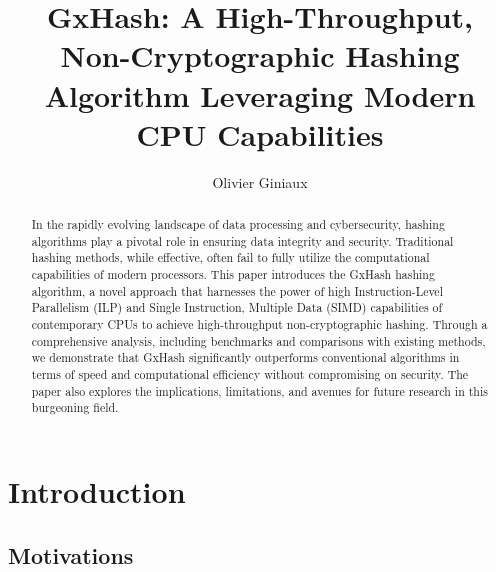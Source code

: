 \documentclass[10pt]{article}
\title{GxHash: A High-Throughput, Non-Cryptographic Hashing Algorithm Leveraging Modern CPU Capabilities}
\author{Olivier Giniaux}
\date{}
\begin{document}
\maketitle

\begin{abstract}

In the rapidly evolving landscape of data processing and cybersecurity, hashing algorithms play a pivotal role in ensuring data integrity and security.
Traditional hashing methods, while effective, often fail to fully utilize the computational capabilities of modern processors.
This paper introduces the GxHash hashing algorithm, a novel approach that harnesses the power of high Instruction-Level Parallelism (ILP) and Single Instruction, Multiple Data (SIMD) capabilities of contemporary CPUs to achieve high-throughput non-cryptographic hashing. Through a comprehensive analysis, including benchmarks and comparisons with existing methods, we demonstrate that GxHash significantly outperforms conventional algorithms in terms of speed and computational efficiency without compromising on security. The paper also explores the implications, limitations, and avenues for future research in this burgeoning field.

\end{abstract}

\begin{multicols}{2}
\tableofcontents
\end{multicols}

\clearpage
\section{Introduction}

\subsection{Motivations}
\end{document}
